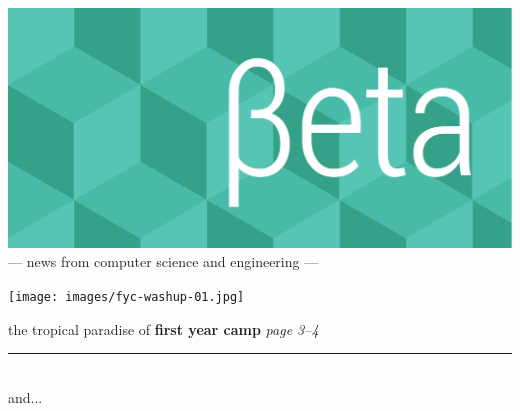 \documentclass[twoside]{article}
\date{30 March 2015}
\begin{document}
\thispagestyle{empty}
\begingroup%
\vspace*{-3.5cm}\centering\hspace*{-2.8cm}%
\includegraphics[trim=0mm 20mm 0mm 0mm, clip, width=22cm]{../../style/beta-logo.pdf}%
\vspace{1em}
{\sffamily\fontsize{32pt}{32pt}\selectfont --- news from computer science and engineering ---}
\endgroup\vspace*{3ex}

\center
\texttt{[image: images/fyc-washup-01.jpg]}

{\sffamily\fontsize{24pt}{24pt}\selectfont the tropical paradise of \bfseries first year camp}%
\hfill{\rmfamily\fontsize{14pt}{14pt}\selectfont\it page 3--4}
\endcenter

\vfill\center\rule[4pt]{0.75\linewidth}{0.75pt}\\ {\sffamily\fontsize{24pt}{24pt}\selectfont and...}\endcenter\vfill
\end{document}
